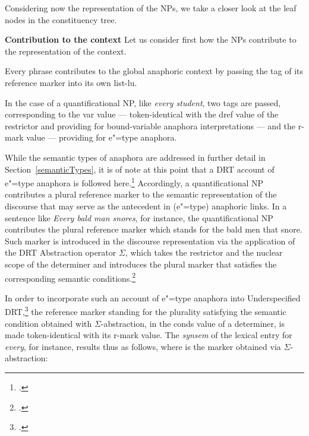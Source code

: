 \documentclass[output=paper
,modfonts
,nonflat]{langsci/langscibook}
\begin{document}
Considering now the representation of the NPs,
we take a closer look at the leaf nodes in the constituency tree. 

\textbf{Contribution to the context} Let us
consider first how the NPs contribute to the representation of
the context.

Every phrase contributes 
to the global anaphoric context by passing 
the tag of its reference marker into its own {\sc list-lu}.  

In the case of a quantificational NP, like
\emph{every student}, two tags are passed, corresponding to the 
{\sc var} value 
 --- token-identical
with the {\sc dref} value of the restrictor and
providing for bound-variable anaphora interpretations --- and the
{\sc r-mark} value
 --- providing for
e"=type anaphora. 

While the semantic types of anaphora are addressed in further detail in Section~\ref{semanticTypes},
it is of note at this point that a DRT account of e"=type anaphora is followed here.\footnote{
\citep[p.311ff]{kamp:drt93}.} 
Accordingly, a quantificational NP contributes a plural reference marker to the
semantic representation of the discourse that may serve as the antecedent in (e"=type) 
anaphoric links. In a sentence like \emph{Every bald man snores}, for instance,
the quantificational NP contributes 
the plural reference marker which stands for the bald
men that snore. Such marker is introduced in the discourse representation
via the application of the DRT Abstraction operator $\Sigma$, which
takes the restrictor and the nuclear scope of the determiner and
introduces the plural marker that satisfies the corresponding
semantic conditions.\footnote{
\citep[p.310]{kamp:drt93}.}

In order to incorporate such an account of e"=type anaphora
into Underspecified DRT,\footnote{
\citep{frank:sem95}.} 
the reference marker standing for the plurality
satisfying the semantic condition obtained with  
\mbox{$\Sigma$-abstraction}, in the {\sc conds} value of a determiner, 
is made token-identical with its {\sc r-mark} value. The \emph{synsem} of the
lexical  entry for \emph{every}, for instance, results thus as follows, where
is the marker obtained
via 
\mbox{$\Sigma$-abstraction}:
% 
\end{document}
